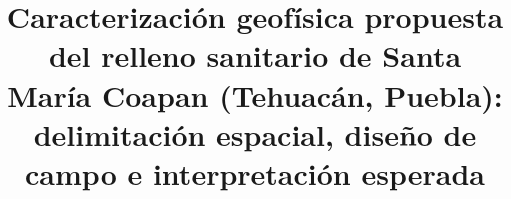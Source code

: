 \documentclass[conference]{IEEEtran}
\begin{document}
\pagestyle{plain}
\renewcommand{\IEEEkeywordsname}{Palabras clave}\renewcommand{\abstractname}{Resumen}

\title{Caracterizaci\'on geof\'isica propuesta del relleno sanitario de Santa Mar\'ia Coapan (Tehuac\'an, Puebla): delimitaci\'on espacial, dise\~no de campo e interpretaci\'on esperada}

\author{
}

\maketitle

\end{document}

